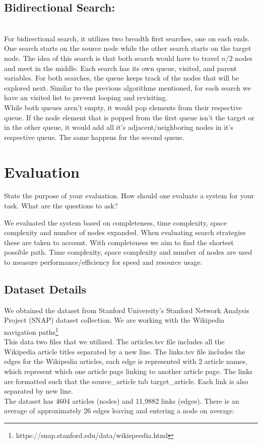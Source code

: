 \documentclass[letterpaper]{article} %
\begin{document}
\subsection{Bidirectional Search:}\\
For bidirectional search, it utilizes two breadth first searches, one on each ends. One search starts on the source node while the other search starts on the target node. The idea of this search is that both search would have to travel $n/2$ nodes and meet in the middle. Each search has its own queue, visited, and parent variables. For both searches, the queue keeps track of the nodes that will be explored next. Similar to the previous algorithms mentioned, for each search we have an visited list to prevent looping and revisiting.\\
While both queues aren't empty, it would pop elements from their respective queue. If the node element that is popped from the first queue isn't the target or in the other queue, it would add all it's adjacent/neighboring nodes in it's respective queue. The same happens for the second queue.

\section{Evaluation}

State the purpose of your evaluation. How should one evaluate a system for your task. What are the questions to ask?

We evaluated the system based on completeness, time complexity, space complexity and number of nodes expanded. When evaluating search strategies these are taken to account. With completeness we aim to find the shortest possible path. Time complexity, space complexity and number of nodes are used to measure performance/efficiency for speed and resource usage.

\subsection{Dataset Details}

We obtained the dataset from Stanford University's Stanford Network Analysis Project (SNAP) dataset collection. We are working with the Wikipedia navigation paths\footnote{https://snap.stanford.edu/data/wikispeedia.html}\\
This data two files that we utilized. The articles.tsv file includes all the Wikipedia article titles separated by a new line. The links.tsv file includes the edges for the Wikipedia articles, each edge is represented with 2 article names, which represent which one article page linking to another article page. The links are formatted such that the source\_article tab target\_article. Each link is also separated by new line.\\
The dataset has 4604 articles (nodes) and 11,9882 links (edges). There is an average of approximately 26 edges leaving and entering a node on average.
\end{document}
